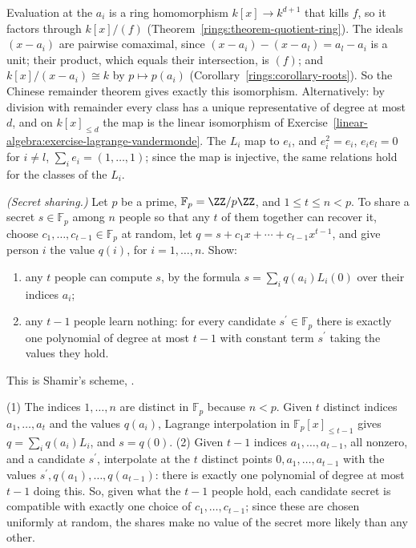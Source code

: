 \begin{solution}
Evaluation at the $a_i$ is a ring homomorphism $k[x] \to k^{d+1}$ that kills $f$, so it factors through $k[x]/(f)$ (Theorem~\ref{rings:theorem-quotient-ring}). The ideals $(x - a_i)$ are pairwise comaximal, since
$(x - a_i) - (x - a_l) = a_l - a_i$ is a unit; their product, which equals their intersection, is $(f)$; and $k[x]/(x - a_i) \cong k$ by $p \mapsto p(a_i)$ (Corollary~\ref{rings:corollary-roots}). So the
Chinese remainder theorem gives exactly this isomorphism. Alternatively: by division with remainder every class has a unique representative of degree at most $d$, and on $k[x]_{\leq d}$ the map is the linear
isomorphism of Exercise~\ref{linear-algebra:exercise-lagrange-vandermonde}. The $L_i$ map to $e_i$, and $e_i^2 = e_i$, $e_ie_l = 0$ for $i \neq l$, $\sum_ie_i = (1, \ldots, 1)$; since the map is injective, the same
relations hold for the classes of the $L_i$.
\end{solution}

\begin{exercise}\label{linear-algebra:exercise-shamir}
\emph{(Secret sharing.)} Let $p$ be a prime, $\mathbb{F}_p = \ZZ/p\ZZ$, and $1 \leq t \leq n < p$. To share a secret $s \in \mathbb{F}_p$ among $n$ people so that any $t$ of them together can recover it, choose
$c_1, \ldots, c_{t-1} \in \mathbb{F}_p$ at random, let $q = s + c_1x + \cdots + c_{t-1}x^{t-1}$, and give person $i$ the value $q(i)$, for $i = 1, \ldots, n$. Show:
\begin{enumerate}
\item any $t$ people can compute $s$, by the formula $s = \sum_iq(a_i)L_i(0)$ over their indices $a_i$;
\item any $t - 1$ people learn nothing: for every candidate $s^{\prime} \in \mathbb{F}_p$ there is exactly one polynomial of degree at most $t - 1$ with constant term $s^{\prime}$ taking the values they hold.
\end{enumerate}
This is Shamir's scheme, \cite{shamir-1979}.
\end{exercise}

\begin{solution}
(1) The indices $1, \ldots, n$ are distinct in $\mathbb{F}_p$ because $n < p$. Given $t$ distinct indices $a_1, \ldots, a_t$ and the values $q(a_i)$, Lagrange interpolation in $\mathbb{F}_p[x]_{\leq t-1}$ gives $q = \sum_iq(a_i)L_i$,
and $s = q(0)$. (2) Given $t - 1$ indices $a_1, \ldots, a_{t-1}$, all nonzero, and a candidate $s^{\prime}$, interpolate at the $t$ distinct points $0, a_1, \ldots, a_{t-1}$ with the values $s^{\prime}, q(a_1), \ldots, q(a_{t-1})$: there is exactly one
polynomial of degree at most $t - 1$ doing this. So, given what the $t - 1$ people hold, each candidate secret is compatible with exactly one choice of $c_1, \ldots, c_{t-1}$; since these are chosen uniformly at
random, the shares make no value of the secret more likely than any other.
\end{solution}

